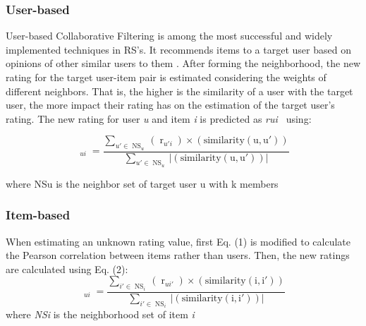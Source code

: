 \documentclass[10pt,twoside,english,a4paper]{article}
\begin{document}
\subsubsection{User-based}
User-based Collaborative Filtering is among the most successful and widely implemented techniques in RS's. It recommends items to a target user based on opinions of other similar users to them . After forming the neighborhood, the new rating for the target user-item pair is estimated considering the weights of different neighbors. That is, the higher is the similarity of a user with the target user, the more impact their rating has on the estimation of the target user’s rating. The new rating for user \textit{u} and item \textit{i} is predicted as \textit{rui~} using: \cite{8550639}

\begin{equation*} \mathop {\tilde {r}}\nolimits _{ui} =\frac {\sum \limits _{u'\in \mathop {NS}\nolimits _{u}} {(\mathop r\nolimits _{u'i})\times (\text {similarity}(\text {u},\text {u}'))}}{\sum \limits _{u'\in \mathop {NS}\nolimits _{u}} {\vert (\text {similarity}(\text {u},\text {u}'))\vert }}\tag{1}\end{equation*}

where NSu is the neighbor set of target user u with k members

\subsubsection{Item-based}
When estimating an unknown rating value, first Eq. (1) is modified to calculate the Pearson correlation between items rather than users. Then, the new ratings are calculated using Eq. (2):
\begin{equation*} \mathop {\tilde {r}}\nolimits _{ui} =\frac {\sum \limits _{i'\in \mathop {NS}\nolimits _{i}} {(\mathop r\nolimits _{u{i}'})\times (\text {similarity}(\text {i},\text {i}'))}}{\sum \limits _{i'\in \mathop {NS}\nolimits _{i}} {\vert (\text {similarity}(\text {i},\text {i}'))\vert }}\tag{2}\end{equation*}
where \textit{NSi} is the neighborhood set of item \textit{i} \cite{8550639}
\end{document}
